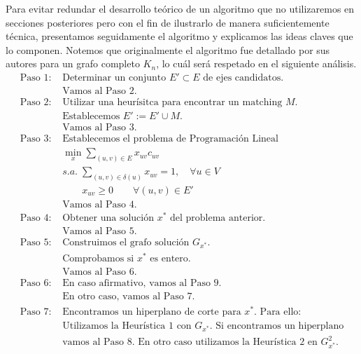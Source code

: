 \documentclass[twoside,a4paper,openright,12pt,tikz]{book}
\begin{document}
Para evitar redundar el desarrollo teórico de un algoritmo que no utilizaremos en secciones posteriores pero con el fin de ilustrarlo de manera suficientemente técnica, presentamos seguidamente el algoritmo y explicamos las ideas claves que lo componen. Notemos que originalmente el algoritmo fue detallado por sus autores para un grafo completo $K_n$, lo cuál será respetado en el siguiente análisis.
\begin{align*}
\text{Paso 1: }&\text{Determinar un conjunto $E'\subset E$ de ejes candidatos.}\\
&\text{Vamos al Paso 2.}\\
\text{Paso 2: }&\text{Utilizar una heurísitca para encontrar un matching $M$.}\\
&\text{Establecemos $E':=E'\cup M$.}\\
&\text{Vamos al Paso 3.}\\
\text{Paso 3: }& \text{Establecemos el problema de Programación Lineal}\\
& \min_x  \sum_{(u,v) \in E}x_{uv}c_{uv}\\
&s.a.\;\sum_{(u,v)\in\delta(u)} x_{uv} = 1, \quad \forall u \in V\\
&\qquad x_{uv} \geq 0 \qquad \forall(u,v)\in E'\\
&\text{Vamos al Paso 4.}\\
\text{Paso 4: }&\text{Obtener una solución $x^*$ del problema anterior.}\\
&\text{Vamos al Paso 5.}\\
\text{Paso 5: }&\text{Construimos el grafo solución $G_{x^*}$.}\\
&\text{Comprobamos si $x^*$ es entero.}\\
&\text{Vamos al Paso 6.}\\
\text{Paso 6: }& \text{En caso afirmativo, vamos al Paso 9.}\\
&\text{En otro caso, vamos al Paso 7.}\\
\text{Paso 7: }&\text{Encontramos un hiperplano de corte para $x^*$. Para ello:}\\
&\text{Utilizamos la Heurística 1 con $G_{x^*}$. Si encontramos un hiperplano}\\
&\text{vamos al Paso 8. En otro caso utilizamos la Heurística 2 en $G^2_{x^*}$.}\\
\end{align*}
\end{document}
